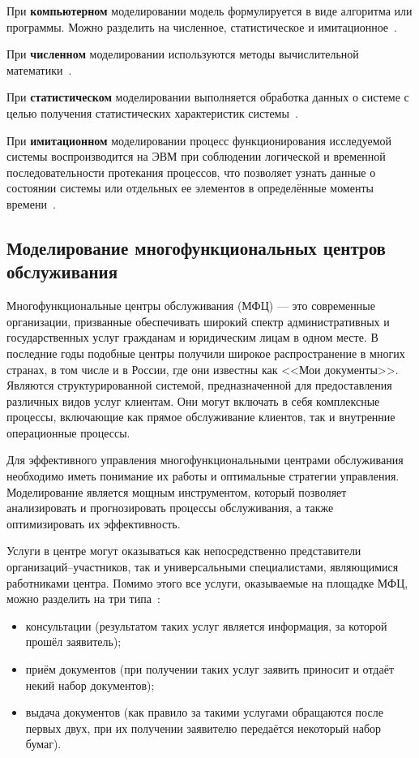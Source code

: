 При \textbf{компьютерном} моделировании модель формулируется в виде алгоритма или программы. Можно разделить на численное, статистическое и имитационное~\cite{m_types}.

При \textbf{численном} моделировании используются методы вычислительной математики~\cite{m_types}.

При \textbf{статистическом} моделировании выполняется обработка данных о системе с целью получения статистических характеристик системы~\cite{m_types}.

При \textbf{имитационном} моделировании процесс функционирования исследуемой системы воспроизводится на ЭВМ при соблюдении логической и временной последовательности протекания процессов, что позволяет узнать данные о состоянии системы или отдельных ее элементов в определённые моменты времени~\cite{m_types}.

\subsection[Моделирование многофункциональных центров\\обслуживания]{Моделирование многофункциональных центров обслуживания}

Многофункциональные центры обслуживания (МФЦ) --- это современные организации, призванные обеспечивать широкий спектр административных и государственных услуг гражданам и юридическим лицам в одном месте. В последние годы подобные центры получили широкое распространение в многих странах, в том числе и в России, где они известны как <<Мои документы>>. Являются структурированной системой, предназначенной для предоставления различных видов услуг клиентам. Они могут включать в себя комплексные процессы, включающие как прямое обслуживание клиентов, так и внутренние операционные процессы.

Для эффективного управления многофункциональными центрами обслуживания необходимо иметь понимание их работы и оптимальные стратегии управления. Моделирование является мощным инструментом, который позволяет анализировать и прогнозировать процессы обслуживания, а также оптимизировать их эффективность.

Услуги в центре могут оказываться как непосредственно представители организаций--участников, так и универсальными специалистами, являющимися работниками центра. Помимо этого все услуги, оказываемые на площадке МФЦ, можно разделить на три типа~\cite{serv_types}:
\begin{itemize}[label=---]
	\item консультации (результатом таких услуг является информация, за которой прошёл заявитель);
	\item приём документов (при получении таких услуг заявить приносит и отдаёт некий набор документов);
	\item выдача документов (как правило за такими услугами обращаются после первых двух, при их получении заявителю передаётся некоторый набор бумаг).
\end{itemize}


